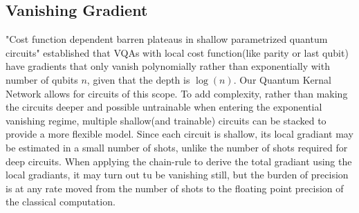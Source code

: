 \documentclass[]{article}
\begin{document}
\subsection{Vanishing Gradient}
"Cost function dependent barren plateaus in shallow parametrized quantum circuits" established that VQAs with local cost function(like parity or last qubit) have gradients that only vanish polynomially rather than exponentially with number of qubits $n$, given that the depth is $\log(n)$. Our Quantum Kernal Network allows for circuits of this scope. To add complexity, rather than making the circuits deeper and possible untrainable when entering the exponential vanishing regime, multiple shallow(and trainable) circuits can be stacked to provide a more flexible model. Since each circuit is shallow, its local gradiant may be estimated in a small number of shots, unlike the number of shots required for deep circuits. When applying the chain-rule to derive the total gradiant using the local gradiants, it may turn out tu be vanishing still, but the burden of precision is at any rate moved from the number of shots to the floating point precision of the classical computation.  
\end{document}
